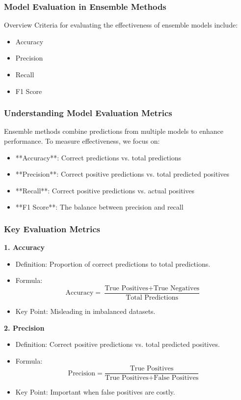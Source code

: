 \documentclass[aspectratio=169]{beamer}
\begin{document}
\begin{frame}[fragile]
    \frametitle{Model Evaluation in Ensemble Methods}
    \begin{block}{Overview}
        Criteria for evaluating the effectiveness of ensemble models include:
        \begin{itemize}
            \item Accuracy
            \item Precision
            \item Recall
            \item F1 Score
        \end{itemize}
    \end{block}
\end{frame}

\begin{frame}[fragile]
    \frametitle{Understanding Model Evaluation Metrics}
    Ensemble methods combine predictions from multiple models to enhance performance. To measure effectiveness, we focus on:
    \begin{itemize}
        \item **Accuracy**: Correct predictions vs. total predictions
        \item **Precision**: Correct positive predictions vs. total predicted positives
        \item **Recall**: Correct positive predictions vs. actual positives
        \item **F1 Score**: The balance between precision and recall
    \end{itemize}
\end{frame}

\begin{frame}[fragile]
    \frametitle{Key Evaluation Metrics}

    \textbf{1. Accuracy}
    \begin{itemize}
        \item Definition: Proportion of correct predictions to total predictions.
        \item Formula: 
        \[
        \text{Accuracy} = \frac{\text{True Positives} + \text{True Negatives}}{\text{Total Predictions}}
        \]
        \item Key Point: Misleading in imbalanced datasets.
    \end{itemize}

    \textbf{2. Precision}
    \begin{itemize}
        \item Definition: Correct positive predictions vs. total predicted positives.
        \item Formula: 
        \[
        \text{Precision} = \frac{\text{True Positives}}{\text{True Positives} + \text{False Positives}}
        \]
        \item Key Point: Important when false positives are costly.
    \end{itemize}
\end{frame}
\end{document}
